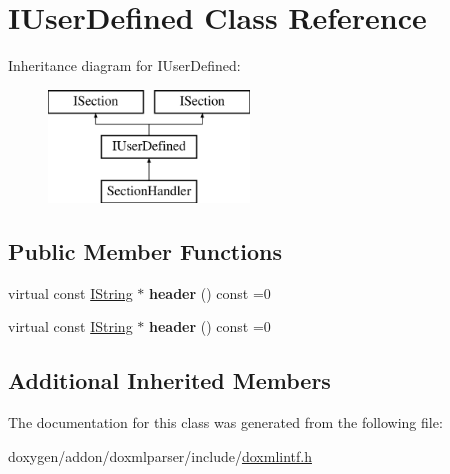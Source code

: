 \hypertarget{class_i_user_defined}{}\section{I\+User\+Defined Class Reference}
\label{class_i_user_defined}
Inheritance diagram for I\+User\+Defined\+:\begin{figure}[H]
\begin{center}
\leavevmode
\includegraphics[height=3.000000cm]{class_i_user_defined}
\end{center}
\end{figure}
\subsection*{Public Member Functions}
\begin{DoxyCompactItemize}
\item 
\mbox{\label{class_i_user_defined_ad9ecb901db6a5c31d5493c7fd8317d78}} 
virtual const \mbox{\hyperlink{class_i_string}{I\+String}} $\ast$ {\bfseries header} () const =0
\item 
\mbox{\label{class_i_user_defined_ad9ecb901db6a5c31d5493c7fd8317d78}} 
virtual const \mbox{\hyperlink{class_i_string}{I\+String}} $\ast$ {\bfseries header} () const =0
\end{DoxyCompactItemize}
\subsection*{Additional Inherited Members}


The documentation for this class was generated from the following file\+:\begin{DoxyCompactItemize}
\item 
doxygen/addon/doxmlparser/include/\mbox{\hyperlink{include_2doxmlintf_8h}{doxmlintf.\+h}}\end{DoxyCompactItemize}
